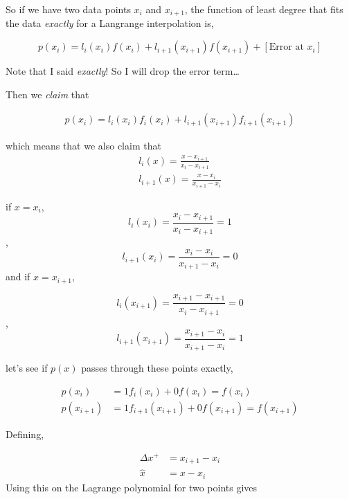 \documentclass[12pt]{article}
\begin{document}
So if we have two data points $x_i$ and $x_{i+1}$, the function of least degree
that fits the data \textit{exactly} for a Langrange interpolation is,

\begin{equation*}
    p(x_i) = l_{i}(x_i)f(x_{i}) + l_{i+1}(x_{i+1})f(x_{i+1}) + \left[\text{
        Error at $x_i$}
    \right]
\end{equation*}

Note that I said \textit{exactly}! So I will drop the error term\dots

Then we \textit{claim} that

\begin{align*}
    p(x_i) =  
    l_i\left( x_i\right)f_i\left( x_i\right) + 
    l_{i+1}\left( x_{i+1}\right)f_{i+1}\left( x_{i+1}\right) 
\end{align*}

which means that we also claim that
\begin{align*}
    l_i(x) = \frac{x - x_{i+1}}{x_{i} - x_{i+1}} \\
    l_{i+1}(x) = \frac{x - x_{i}}{x_{i+1} - x_{i}}
\end{align*}

if $x = x_i$,
\[ l_i(x_i) = \frac{x_i - x_{i+1}}{x_i - x_{i+1} }= 1\], 
\[l_{i + 1}(x_i) = \frac{x_i-x_i}{x_{i+1} - x_{i}} = 0\]
and 
if $x = x_{i+1}$,

\[ l_i(x_{i+1}) = \frac{x_{i+1} - x_{i+1}}{x_i - x_{i+1} }= 0\], 
\[l_{i + 1}(x_{i+1}) = \frac{x_{i+1}-x_i}{x_{i+1} - x_{i}} = 1\]

let's see if $p\left( x \right)$ passes through these points exactly,

\begin{align*}
    p\left( x_i \right) &= 1 f_i(x_i) + 0 f\left( x_i  \right) =  f\left( x_i  \right) \\
    p\left( x_{i+1} \right) &= 1 f_{i+1}(x_{i+1}) + 0 f\left( x_{i+1}  \right) =  f\left( x_{i+1}  \right) 
\end{align*}

Defining,

\begin{align*}
    \Delta x^+ &= x_{i+1} - x_i \\
    \hat{x} &= x - x_i 
\end{align*}
Using this on the Lagrange polynomial for two points gives 
\end{document}
